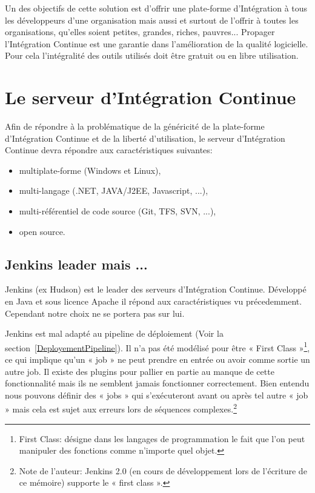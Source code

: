   Un des objectifs de cette solution est d'offrir une plate-forme d'Intégration à tous les développeurs d'une organisation mais aussi et surtout de l'offrir à toutes les organisations, qu'elles soient petites, grandes, riches, pauvres... Propager l'Intégration Continue est une garantie dans l'amélioration de la qualité logicielle. Pour cela l'intégralité des outils utilisés doit être gratuit ou en libre utilisation.

  \section{Le serveur d’Intégration Continue}
  Afin de répondre à la problématique de la généricité de la plate-forme d'Intégration Continue et de la liberté d'utilisation, le serveur d'Intégration Continue devra répondre aux caractéristiques suivantes:\\

  \begin{itemize}
    \item multiplate-forme (Windows et Linux),
    \item multi-langage (.NET, JAVA/J2EE, Javascript, ...),
    \item multi-référentiel de code source (Git, TFS, SVN, ...),
    \item open source.\\
  \end{itemize}

    \subsection{Jenkins leader mais ...}
    Jenkins (ex Hudson) est le leader des serveurs d'Intégration Continue. Développé en Java et sous licence Apache il répond aux caractéristiques vu précedemment. Cependant notre choix ne se portera pas sur lui.

    Jenkins est mal adapté au pipeline de déploiement (Voir la section~\ref{DeployementPipeline}). Il n’a pas été modélisé pour être « First Class »\footnote{First Class: désigne dans les langages de programmation le fait que l'on peut manipuler des fonctions comme n'importe quel objet.}, ce qui implique qu'un « job » ne peut prendre en entrée ou avoir comme sortie un autre job. Il existe des plugins pour pallier en partie au manque de cette fonctionnalité mais ils ne semblent jamais fonctionner correctement. Bien entendu nous pouvons définir des « jobs » qui s’exécuteront avant ou après tel autre « job » mais cela est sujet aux erreurs lors de séquences complexes.\footnote{Note de l'auteur: Jenkins 2.0 (en cours de développement lors de l'écriture de ce mémoire) supporte le « first class ».}\\

